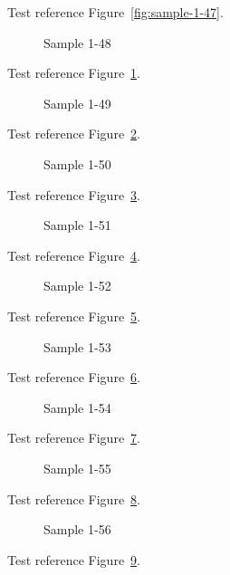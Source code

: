 Test reference Figure~\ref{fig:sample-1-47}.

\begin{figure}[tbhp]
\caption{Sample 1-48}
\label{fig:sample-1-48}
\end{figure}

Test reference Figure~\ref{fig:sample-1-48}.

\begin{figure}[tbhp]
\caption{Sample 1-49}
\label{fig:sample-1-49}
\end{figure}

Test reference Figure~\ref{fig:sample-1-49}.

\begin{figure}[tbhp]
\caption{Sample 1-50}
\label{fig:sample-1-50}
\end{figure}

Test reference Figure~\ref{fig:sample-1-50}.

\begin{figure}[tbhp]
\caption{Sample 1-51}
\label{fig:sample-1-51}
\end{figure}

Test reference Figure~\ref{fig:sample-1-51}.

\begin{figure}[tbhp]
\caption{Sample 1-52}
\label{fig:sample-1-52}
\end{figure}

Test reference Figure~\ref{fig:sample-1-52}.

\begin{figure}[tbhp]
\caption{Sample 1-53}
\label{fig:sample-1-53}
\end{figure}

Test reference Figure~\ref{fig:sample-1-53}.

\begin{figure}[tbhp]
\caption{Sample 1-54}
\label{fig:sample-1-54}
\end{figure}

Test reference Figure~\ref{fig:sample-1-54}.

\begin{figure}[tbhp]
\caption{Sample 1-55}
\label{fig:sample-1-55}
\end{figure}

Test reference Figure~\ref{fig:sample-1-55}.

\begin{figure}[tbhp]
\caption{Sample 1-56}
\label{fig:sample-1-56}
\end{figure}

Test reference Figure~\ref{fig:sample-1-56}.

